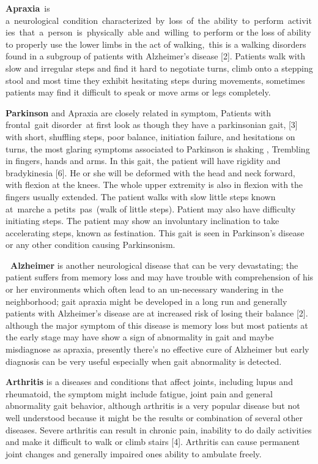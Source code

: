 \documentclass[a4paper, parskip=full]{scrartcl}
\begin{document}
\textbf{Apraxia} is a neurological condition characterized by loss of the ability to perform activities that a person is physically able and willing to perform or the loss of ability to properly use the lower limbs in the act of walking, this is a walking disorders found in a subgroup of patients with Alzheimer’s disease [2]. Patients walk with slow and irregular steps and find it hard to negotiate turns, climb onto a stepping stool and most time they exhibit hesitating steps during movements, sometimes patients may find it difficult to speak or move arms or legs completely.

\textbf{Parkinson} and Apraxia are closely related in symptom, Patients with frontal gait disorder at first look as though they have a parkinsonian gait, [3] with short, shuffling steps, poor balance, initiation failure, and hesitations on turns, the most glaring  symptoms associated to Parkinson  is shaking , Trembling in fingers, hands and arms.   In this gait, the patient will have rigidity and bradykinesia [6]. He or she will be deformed with the head and neck forward, with flexion at the knees. The whole upper extremity is also in flexion with the fingers usually extended. The patient walks with slow little steps known at marche a petits pas (walk of little steps). Patient may also have difficulty initiating steps. The patient may show an involuntary inclination to take accelerating steps, known as festination. This gait is seen in Parkinson's disease or any other condition causing Parkinsonism.

\textbf{ Alzheimer} is another neurological disease that can be very devastating; the patient suffers from memory loss and may have trouble with comprehension of his or her environments which often lead to an un-necessary wandering in the neighborhood; gait apraxia might be developed in a long run and generally patients with Alzheimer’s disease are at increased risk of losing their balance [2]. although the major symptom of this disease is memory loss but most patients at the early stage may have show a sign of abnormality in gait and maybe misdiagnose as apraxia, presently there’s no effective cure of Alzheimer but early diagnosis can be very useful especially when gait abnormality is detected.

\textbf{Arthritis} is a diseases and conditions that affect joints, including lupus and rheumatoid, the symptom might include fatigue, joint pain and general abnormality gait behavior, although arthritis is a very popular disease but not well understood because it might be the results or combination of several other diseases. Severe arthritis can result in chronic pain, inability to do daily activities and make it difficult to walk or climb stairs [4]. Arthritis can cause permanent joint changes and generally impaired ones ability to ambulate freely.
\end{document}
